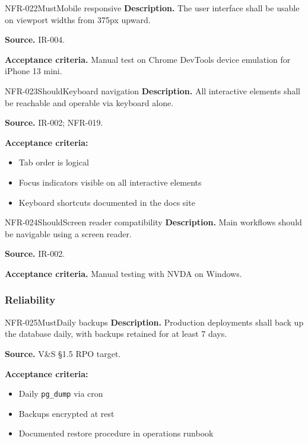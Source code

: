 \documentclass[11pt,a4paper]{article}
\begin{document}
\begin{requirement}{NFR-022}{Must}{Mobile responsive}
\textbf{Description.} The user interface shall be usable on viewport widths from 375px upward.

\textbf{Source.} IR-004.

\textbf{Acceptance criteria.} Manual test on Chrome DevTools device emulation for iPhone 13 mini.
\end{requirement}

\begin{requirement}{NFR-023}{Should}{Keyboard navigation}
\textbf{Description.} All interactive elements shall be reachable and operable via keyboard alone.

\textbf{Source.} IR-002; NFR-019.

\textbf{Acceptance criteria:}
\begin{itemize}
    \item Tab order is logical
    \item Focus indicators visible on all interactive elements
    \item Keyboard shortcuts documented in the docs site
\end{itemize}
\end{requirement}

\begin{requirement}{NFR-024}{Should}{Screen reader compatibility}
\textbf{Description.} Main workflows should be navigable using a screen reader.

\textbf{Source.} IR-002.

\textbf{Acceptance criteria.} Manual testing with NVDA on Windows.
\end{requirement}

\subsubsection{Reliability}

\begin{requirement}{NFR-025}{Must}{Daily backups}
\textbf{Description.} Production deployments shall back up the database daily, with backups retained for at least 7 days.

\textbf{Source.} V\&S \S1.5 RPO target.

\textbf{Acceptance criteria:}
\begin{itemize}
    \item Daily \texttt{pg\_dump} via cron
    \item Backups encrypted at rest
    \item Documented restore procedure in operations runbook
\end{itemize}
\end{requirement}
\end{document}
